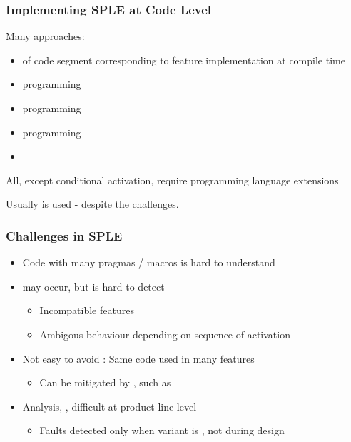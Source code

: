 \documentclass[
    ../../Software_Engineering_Summary.tex,
]
{subfiles}
\begin{document}
\subsubsection{Implementing SPLE at Code Level}
Many approaches:
\begin{itemize}
    \item {} of code segment corresponding to feature implementation at compile time
    \item {} programming
    \item {} programming
    \item {} programming
    \item {}
\end{itemize}
All, except conditional activation, require programming language extensions

Usually  is used - despite the challenges.

\subsubsection{Challenges in SPLE}
\begin{itemize}
    \item Code with many pragmas / macros is hard to understand
    \item {} may occur, but is hard to detect
    \begin{itemize}
        \item Incompatible features
        \item Ambigous behaviour depending on sequence of activation
    \end{itemize}
    \item Not easy to avoid : Same code used in many features
    \begin{itemize}
        \item Can be mitigated by , such as 
    \end{itemize}
    \item Analysis, ,  difficult at product line level
    \begin{itemize}
        \item Faults detected only when variant is , not during design
    \end{itemize}
\end{itemize}
\end{document}
